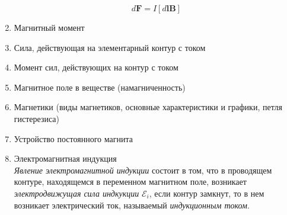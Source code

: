 \documentclass[11pt]{article}
\begin{document}
\begin{enumerate}
		$$
			d\mathbf{F} = I[d\mathbf{lB}]
		$$
		\item Магнитный момент\\
		\item Сила, действующая на элементарный контур с током\\
		\item Момент сил, действующих на контур с током\\
		\item Магнитное поле в веществе (намагниченность)\\
		\item Магнетики (виды магнетиков, основные характеристики и графики, петля гистерезиса)\\
		\item Устройство постоянного магнита\\
		\item Электромагнитная индукция\\
		\textit{Явление электромагнитной индукции} состоит в том, что в проводящем контуре, находящемся в переменном магнитном поле, возникает \textit{электродвижущая сила индкукции} $\mathcal{E}_i$, если контур замкнут, то в нем возникает электрический ток, называемый \textit{индукционным током}.


\end{enumerate}
\end{document}
